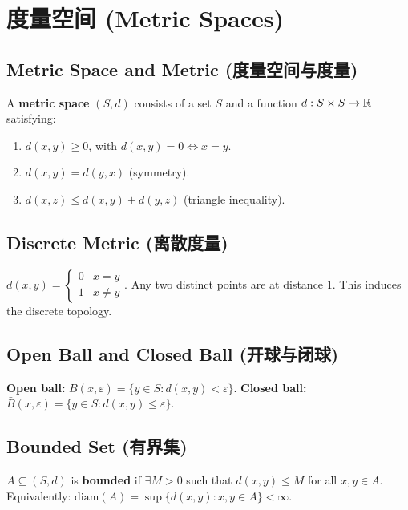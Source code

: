 \documentclass{article}
\begin{document}
\section{度量空间 (Metric Spaces)}

\subsection{Metric Space and Metric (度量空间与度量)}\label{def:metric}
\begin{definition}
  A \textbf{metric space} $(S, d)$ consists of a set $S$ and a
  function $d : S \times S \to \mathbb{R}$ satisfying:
  \begin{enumerate}
    \item $d(x, y) \ge 0$, with $d(x, y) = 0 \iff x = y$.
    \item $d(x, y) = d(y, x)$ (symmetry).
    \item $d(x, z) \le d(x, y) + d(y, z)$ (triangle inequality).
  \end{enumerate}
\end{definition}

\subsection{Discrete Metric (离散度量)}\label{def:discrete-metric}
$d(x, y) =
\begin{cases} 0 & x = y \\ 1 & x \ne y
\end{cases}$. Any two distinct points are at distance 1. This induces
the discrete topology.

\subsection{Open Ball and Closed Ball (开球与闭球)}\label{def:balls}
\textbf{Open ball:} $B(x, \varepsilon) = \{y \in S : d(x, y) < \varepsilon\}$.
\textbf{Closed ball:} $\bar{B}(x, \varepsilon) = \{y \in S : d(x, y)
\le \varepsilon\}$.

\subsection{Bounded Set (有界集)}\label{def:bounded}
$A \subseteq (S, d)$ is \textbf{bounded} if $\exists M > 0$ such that
$d(x, y) \le M$ for all $x, y \in A$.
Equivalently: $\text{diam}(A) = \sup\{d(x, y) : x, y \in A\} < \infty$.
\end{document}
